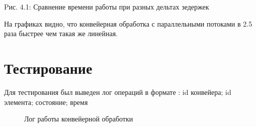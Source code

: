 \documentclass[12pt]{report}
\begin{document}
\begin{center}
Pис. 4.1: Сравнение времени работы при разных дельтах зедержек
\end{center}


На графиках видно, что конвейерная обработка с параллельными потоками в 2.5 раза быстрее чем такая же линейная.

\section{Тестирование}
Для тестирования был выведен лог операций в формате : 
id конвейера; id элемента; состояние; время

\begin{figure}[h]
	\caption{Лог работы конвейерной обработки}
	\label{fig:v_st}
\end{figure}
\end{document}
